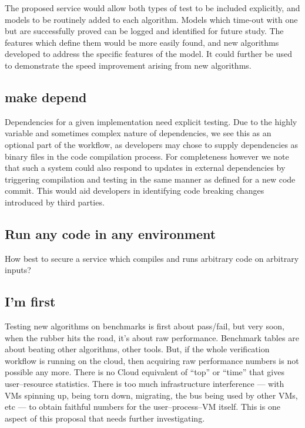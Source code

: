 \documentclass{llncs}
\begin{document}
The proposed service would allow both types of test to be included explicitly,
and models to be routinely added to each algorithm. Models which time-out with 
one but are successfully proved can be logged and identified for future study.
The features which define them would be more easily found, and new algorithms
developed to address the specific features of the model. It could further be 
used to demonstrate the speed improvement arising from new algorithms.

\subsection{make depend}

Dependencies for a given implementation need explicit
testing. Due to the highly variable and sometimes complex nature of
dependencies, we see this as an optional part of the workflow, as
developers may chose to supply dependencies as binary files in the
code compilation process. For completeness however we note that such a
system could also respond to updates in external dependencies by
triggering compilation and testing in the same manner as defined for a
new code commit. This would aid developers in identifying code
breaking changes introduced by third parties.


\subsection{Run any code in any environment}
How best to secure a service which compiles and runs arbitrary code on arbitrary inputs?

\subsection{I'm first}

Testing new algorithms on benchmarks is first about pass/fail, but
very soon, when the rubber hits the road, it's about raw
performance. Benchmark tables are about beating other algorithms,
other tools. But, if the whole verification workflow is running on the
cloud, then acquiring raw performance numbers is not possible any
more. There is no Cloud equivalent of ``top'' or ``time'' that gives
user--resource statistics. There is too much infrastructure
interference --- with VMs spinning up, being torn down, migrating, the
bus being used by other VMs, etc --- to obtain faithful numbers for
the user--process--VM itself. This is one aspect of this proposal that
needs further investigating. 
\end{document}
